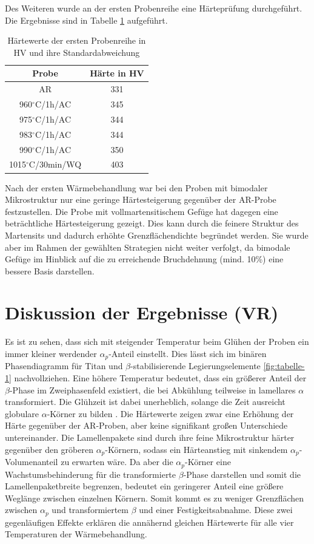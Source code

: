 Des Weiteren wurde an der ersten Probenreihe eine Härteprüfung durchgeführt. Die Ergebnisse sind in Tabelle \ref{Tabelle 5} aufgeführt. 

\begin{table}
	\centering
	\begin{tabular}{|c|c|}
		\hline 
		Probe & Härte in HV \\ 
		\hline 
		AR & 331 \\ 
		\hline 
		960$^\circ$C/1h/AC & 345 \\ 
		\hline 
		975$^\circ$C/1h/AC & 344 \\ 
		\hline 
		983$^\circ$C/1h/AC & 344 \\ 
		\hline 
		990$^\circ$C/1h/AC & 350 \\ 
		\hline 
		1015$^\circ$C/30min/WQ & 403 \\ 
		\hline 
	\end{tabular} 
	\caption{Härtewerte der ersten Probenreihe in HV und ihre Standardabweichung}
	\label{Tabelle 5}
\end{table}

Nach der ersten Wärmebehandlung war bei den Proben mit bimodaler Mikrostruktur nur eine geringe Härtesteigerung gegenüber der AR-Probe festzustellen. 
Die Probe mit vollmartensitischem Gefüge hat dagegen eine beträchtliche Härtesteigerung gezeigt. Dies kann durch die feinere Struktur des Martensits und dadurch erhöhte Grenzflächendichte begründet werden. Sie wurde aber im Rahmen der gewählten Strategien nicht weiter verfolgt, da bimodale Gefüge im Hinblick auf die zu erreichende Bruchdehnung (mind. 10\%) eine bessere Basis darstellen.


\section{Diskussion der Ergebnisse (VR)}

Es ist zu sehen, dass sich mit steigender Temperatur beim Glühen der Proben ein immer kleiner werdender $\alpha_p$-Anteil einstellt. Dies lässt sich im binären Phasendiagramm für Titan und $\beta$-stabilisierende Legierungselemente \ref{fig:tabelle-1} nachvollziehen. Eine höhere Temperatur bedeutet, dass ein größerer Anteil der $\beta$-Phase im Zweiphasenfeld existiert, die bei Abkühlung teilweise in lamellares $\alpha$ transformiert. Die Glühzeit ist dabei unerheblich, solange die Zeit ausreicht globulare $\alpha$-Körner zu bilden \cite{G.LutjeringJ.C.WilliamsA.Gysler.}. 
Die Härtewerte zeigen zwar eine Erhöhung der Härte gegenüber der AR-Proben, aber keine signifikant großen Unterschiede untereinander. Die Lamellenpakete sind durch ihre feine Mikrostruktur härter gegenüber den gröberen $\alpha_p$-Körnern, sodass ein Härteanstieg mit sinkendem $\alpha_p$-Volumenanteil zu erwarten wäre. Da aber die $\alpha_p$-Körner eine Wachstumsbehinderung für die transformierte $\beta$-Phase darstellen und somit die Lamellenpaketbreite begrenzen, bedeutet ein geringerer Anteil eine größere Weglänge zwischen einzelnen Körnern. Somit kommt es zu weniger Grenzflächen zwischen $\alpha_p$ und transformiertem $\beta$ und einer Festigkeitsabnahme. Diese zwei gegenläufigen Effekte erklären die annähernd gleichen Härtewerte für alle vier Temperaturen der Wärmebehandlung. 